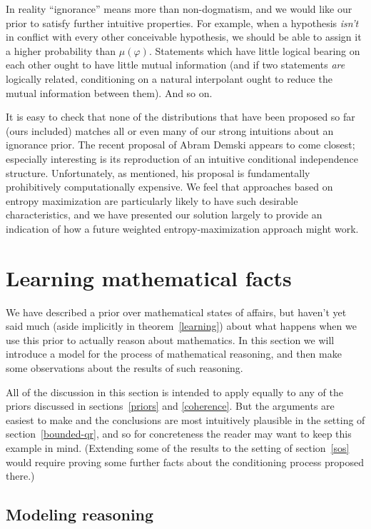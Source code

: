 \documentclass[12pt]{article}
\theoremstyle{definition}
\newcommand{\of}[1]{\left(#1\right)}
\newcommand{\muv}{\mu\of{\vp}}
\newcommand{\vp}{\varphi}
\begin{document}
In reality ``ignorance'' means more than non-dogmatism,
and we would like our prior to satisfy further
intuitive properties.
For example, when a hypothesis \emph{isn't}
in conflict with every other conceivable hypothesis,
we should be able to assign it a higher probability than $\muv$.
Statements which have little logical bearing on each other
ought to have little mutual information
(and if two statements \emph{are} logically related,
conditioning on a natural interpolant ought to reduce
the mutual information between them).
And so on.

It is easy to check that none of the distributions
that have been proposed so far (ours included) matches
all or even many of our strong intuitions about an ignorance
prior.
The recent proposal of Abram Demski appears to come closest; %
especially interesting is its reproduction of an intuitive
conditional independence structure.
Unfortunately, as mentioned, his proposal is fundamentally
prohibitively computationally expensive.
We feel that approaches based on entropy maximization
are particularly likely to have such desirable characteristics,
and we have presented our solution largely to provide an
indication of how a future weighted entropy-maximization approach might work.

\section{Learning mathematical facts}\label{math}

We have described a prior over mathematical states of affairs,
but haven't yet said much (aside implicitly in theorem~\ref{learning}) about what happens when 
we use this prior to actually reason about mathematics.
In this section we will introduce a model for the process of mathematical reasoning,
and then make some observations about the results of such reasoning.

All of the discussion in this section is intended to apply equally
to any of the priors discussed in sections~\ref{priors} and \ref{coherence}.
But the arguments are easiest to make and the conclusions are most intuitively plausible
in the setting of section~\ref{bounded-qr},
and so for concreteness the reader may want to keep this example in mind.
(Extending some of the results to the setting of section~\ref{sos} would require
proving some further facts about the conditioning process proposed there.)

\subsection{Modeling reasoning}
\end{document}
